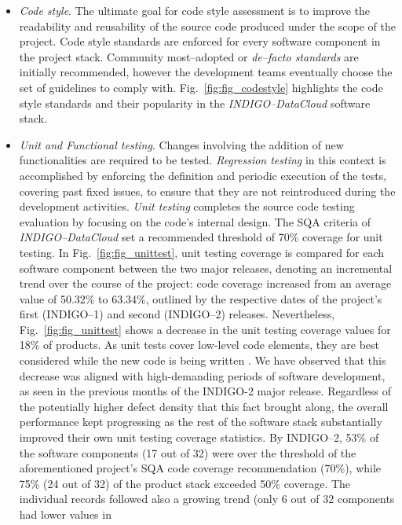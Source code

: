 \begin{itemize}
\item \textit{Code style}.
The ultimate goal for code style assessment is to improve the readability and reusability of the
source code produced under the scope of the
project. Code style standards are enforced for every software component in the project stack. Community
most--adopted or \textit{de--facto standards} are initially recommended, however the development teams eventually
choose the set of guidelines to comply with. Fig.~\ref{fig:fig_codestyle} highlights the code style standards and
their popularity
in the {\sl INDIGO--DataCloud} software stack.

\item \textit{Unit and Functional testing}.
Changes involving the addition of new functionalities are required to be tested. \textit{Regression
testing} in this context is accomplished by enforcing the definition and periodic execution
of the tests, covering past fixed issues, to ensure that they are not reintroduced during the development
activities. \textit{Unit testing} completes the source code testing evaluation by focusing on the code's
internal design. The SQA criteria of {\sl INDIGO--DataCloud} set a recommended threshold of 70\% coverage
for unit testing. In Fig.~\ref{fig:fig_unittest}, unit testing coverage is compared for each software
component between the two major releases, denoting an incremental trend over the course of the project:
code coverage increased from an average value of 50.32\% to 63.34\%, outlined by the respective dates of
the project's first (INDIGO--1) and second (INDIGO--2) releases. Nevertheless, Fig.~\ref{fig:fig_unittest}
shows a decrease in the unit testing coverage values for 18\% of products. As unit tests cover low-level
code elements, they are best considered while the new code is being written \cite{unit-test-frameworks}.
We have observed that this decrease was aligned with high-demanding periods of software development, as
seen in the previous months of the INDIGO-2 major release. Regardless of the potentially higher defect
density that this fact brought along, the overall performance kept progressing as the rest of the software
stack substantially improved their own unit testing coverage statistics. By INDIGO--2, 53\% of the software
components (17 out of 32) were over the threshold of the aforementioned project's SQA code coverage
recommendation (70\%), while 75\% (24 out of 32) of the product stack exceeded 50\% coverage.
The individual records followed also a growing trend (only 6 out of 32 components had lower values in

\end{itemize}
